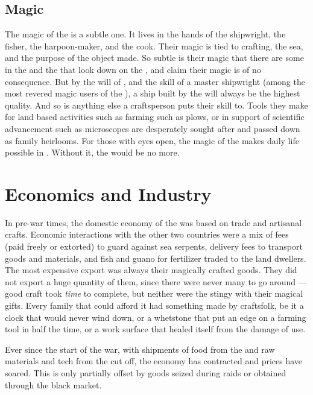 \documentclass[blue]{GL2020}
\begin{document}
\subsection*{Magic}
The magic of the \pShip{} is a subtle one. It lives in the hands of the shipwright, the fisher, the harpoon-maker, and the cook. Their magic is tied to crafting, the sea, and the purpose of the object made. So subtle is their magic that there are some in the \pFarm{} and the \pTech{} that look down on the \pShippies{}, and claim their magic is of no consequence. But by the will of \cEbb{\full}, and the skill of a master shipwright (among the most revered magic users of the \pShippies{}), a ship built by the \pShippies{} will always be the highest quality. And so is anything else a \pShippie{} craftsperson puts their skill to. Tools they make for land based activities such as farming such as plows, or in support of scientific advancement such as microscopes are desperately sought after and passed down as family heirlooms. For those with eyes open, the magic of the \pShippies{} makes daily life possible in \pEarth{}. Without it, the \pShippies{} would be no more.

\section*{Economics and Industry}
In pre-war times, the domestic economy of the \pShip{} was based on trade and artisanal crafts. Economic interactions with the other two countries were a mix of fees (paid freely or extorted) to guard against sea serpents, delivery fees to transport goods and materials, and fish and guano for fertilizer traded to the land dwellers. The \pShippies{} most expensive export was always their magically crafted goods. They did not export a huge quantity of them, since there were never many to go around — good craft took \emph{time} to complete, but neither were the \pShippies{} stingy with their magical gifts. Every family that could afford it had something made by \pShippie{} craftsfolk, be it a clock that would never wind down, or a whetstone that put an edge on a farming tool in half the time, or a work surface that healed itself from the damage of use.

Ever since the start of the war, with shipments of food from the \pFarm{} and raw materials and tech from the \pTech{} cut off, the \pShippie{} economy has contracted and prices have soared. This is only partially offset by goods seized during raids or obtained through the black market.
\end{document}
